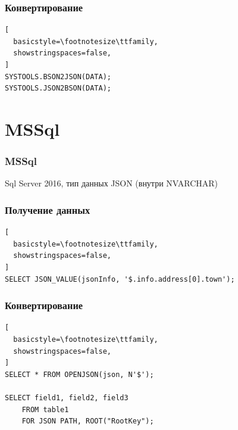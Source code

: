 \documentclass[14pt, compress, aspectratio=169]{beamer}
\begin{document}
\begin{frame}[fragile]
  \frametitle{Конвертирование}

  \vspace{-20pt}
\begin{lstlisting}[
  basicstyle=\footnotesize\ttfamily,
  showstringspaces=false,
]
SYSTOOLS.BSON2JSON(DATA);
SYSTOOLS.JSON2BSON(DATA);
\end{lstlisting}

\end{frame}

\section{MSSql}

\begin{frame}[fragile]
    \frametitle{MSSql}

    Sql Server 2016, тип данных JSON (внутри NVARCHAR)
\end{frame}
 
\begin{frame}[fragile]
  \frametitle{Получение данных}

\begin{lstlisting}[
  basicstyle=\footnotesize\ttfamily,
  showstringspaces=false,
]
SELECT JSON_VALUE(jsonInfo, '$.info.address[0].town');
\end{lstlisting}

\end{frame}

\begin{frame}[fragile]
  \frametitle{Конвертирование}

  \vspace{-20pt}
\begin{lstlisting}[
  basicstyle=\footnotesize\ttfamily,
  showstringspaces=false,
]
SELECT * FROM OPENJSON(json, N'$');

SELECT field1, field2, field3
    FROM table1
    FOR JSON PATH, ROOT("RootKey");
\end{lstlisting}

\end{frame}
\end{document}
